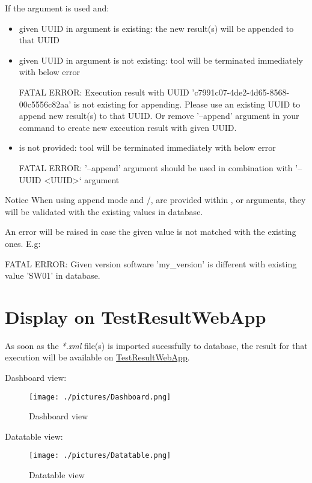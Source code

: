    If the argument  is used and:
    \begin{itemize}
      \item given UUID in  argument is existing:
            the new result(s) will be appended to that UUID
      \item given UUID in  argument is not existing:
            tool will be terminated immediately with below error
\begin{robotlog}
FATAL ERROR: Execution result with UUID 'c7991c07-4de2-4d65-8568-00c5556c82aa' is not existing for appending.
             Please use an existing UUID to append new result(s) to that UUID.
             Or remove '--append' argument in your command to create new execution result with given UUID.
\end{robotlog}
      \item {} is not provided:
            tool will be terminated immediately with below error
\begin{robotlog}
FATAL ERROR: '--append' argument should be used in combination with '--UUID <UUID>` argument
\end{robotlog}
    \end{itemize}

    \begin{boxhint} {Notice}
      When using append mode and /,
       are provided within ,
       or  arguments, they will
      be validated with the existing values in database.

      An error will be raised in case the given value is not matched with the
      existing ones. E.g:
\begin{robotlog}
FATAL ERROR: Given version software 'my_version' is different with existing value 'SW01' in database.
\end{robotlog}
    \end{boxhint}

\newpage
\hypertarget{display-on-testresultwebapp}{%
\section{Display on TestResultWebApp}\label{display-on-testresultwebapp}}

As soon as the \emph{*.xml} file(s) is imported sucessfully to database,
the result for that execution will be available on
\href{https://github.com/test-fullautomation/testresultwebapp}{TestResultWebApp}.

Dashboard view:

\begin{figure}[h!]
  \texttt{[image: ./pictures/Dashboard.png]}
  \caption{Dashboard view}
\end{figure}

Datatable view:

\begin{figure}[h!]
  \texttt{[image: ./pictures/Datatable.png]}
  \caption{Datatable view}
\end{figure}
